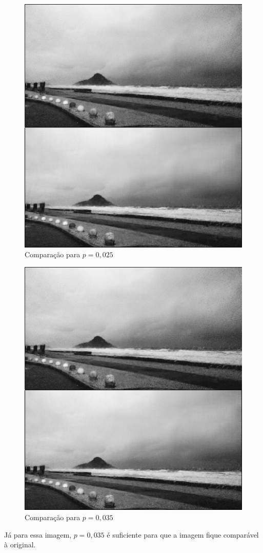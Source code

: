 \documentclass[11pt]{article}
\begin{document}
\begin{enumerate}
            \begin{figure}[H]
                \centering
                \includegraphics[]{2-2-025}
                \caption{Comparação para $p = 0,025$}
            \end{figure}
            
            \begin{figure}[H]
                \centering
                \includegraphics[]{2-2-035}
                \caption{Comparação para $p = 0,035$}
            \end{figure}
            
            Já para essa imagem, $p = 0,035$ é suficiente para que a imagem fique comparável à original.
        
    \end{enumerate}
\end{document}
